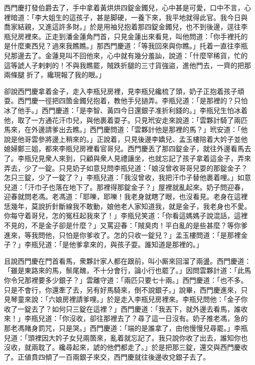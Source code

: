 西門慶打發伯爵去了，手中拿着黃烘烘四錠金鐲兒，心中甚是可愛，口中不言，心裡暗道：「李大姐生的這孩子，甚是脚硬，一養下來，我平地就得此官。我今日與喬家結親，又進這許多財。」於是用袖兒抱着那四錠金鐲兒，也不到後邊，逕往李瓶兒房裡來。正走到潘金蓮角門首，只見金蓮出來看見，叫他問道：「你手裡托的是什麼東西兒？過來我瞧瞧。」那西門慶道：「等我回來與你瞧。」托着一直往李瓶兒那邊去了。{}金蓮見叫不回他來，心中就有幾分羞訕，說道：「什麼罕稀貨，忙的這等諕人子剌剌的！不與我瞧罷，賊跌折腿的三寸貨強盜，進他門去，一齊的把那兩條腿𢱉折了，纔現報了我的眼。」

卻說西門慶拿着金子，走入李瓶兒房裡，見李瓶兒纔梳了頭，奶子正抱着孩子頑耍。西門慶一徑把四箇金鐲兒抱着，教他手兒撾弄。李瓶兒道：「是那裡的？只怕冰了他手。」西門慶道：「是李智、黃四今日還銀子准折利錢的。」李瓶兒生怕冰着他，取了一方通花汗巾兒，與他裹着耍子。只見玳安走來說道：「雲夥計騎了兩匹馬來，在外邊請爹出去瞧。」西門慶問道：「雲夥計他是那裡的馬？」玳安道：「他說是他哥雲參將邊上稍來的。」正說着，只見後邊李嬌兒、孟玉樓陪着大妗子並他媳婦鄭三姐，都來李瓶兒房裡看官哥兒。西門慶丟了那四錠金子，就往外邊看馬去了。李瓶兒見衆人來到，只顧與衆人見禮讓坐，也就忘記了孩子拿着這金子，弄來弄去，少了一錠。只見奶子如意兒問李瓶兒道：「娘沒曾收哥哥兒耍的那錠金子？怎只三錠，少了一錠了？」李瓶兒道：「我沒曾收，我把汗巾子替他裹着哩。」如意兒道：「汗巾子也落在地下了。那裡得那錠金子？」屋裡就亂起來。奶子問迎春，迎春就問老馮。老馮道：「耶嚛，耶嚛！我老身就瞎了眼，也沒看見。老身在這裡恁幾年，莫說折針斷線我不敢動，娘他老人家知道我，就是金子，我老身也不愛。你每守着哥兒，怎的冤枉起我來了！」李瓶兒笑道：「你看這媽媽子說混話，這裡不見的，不是金子卻是什麼？」又罵迎春：「賊臭肉！平白亂的是些甚麼？等你爹進來，等我問他，只怕是你爹收了。怎的只收一錠兒？」孟玉樓問道：「是那裡金子？」李瓶兒道：「是他爹拿來的，與孩子耍。誰知道是那裡的。」

且說西門慶在門首看馬，衆夥計家人都在跟前，叫小厮來回溜了兩盪。西門慶道：「雖是東路來的馬，鬃尾醜，不十分會行，論小行也罷了。」因問雲夥計道：「此馬你令兄那裡要多少銀子？」雲離守道：「兩匹只要七十兩。」西門慶道：「也不多。只是不會行，你還牽了去，另有好馬騎來，倒不說銀子。」說畢，西門慶進來，只見琴童來說：「六娘房裡請爹哩。」於是走入李瓶兒房裡來。李瓶兒問他：「金子你收了一錠去了？如何只三錠在這裡？」西門慶道：「我丟下，就外邊去看馬，誰收來！」李瓶兒道：「你沒收，卻往那裡去了？尋了這一日沒有。奶子推老馮，急的那老馮賭身罰咒，只是哭。」西門慶道：「端的是誰拿了，由他慢慢兒尋罷。」李瓶兒道：「頭裡因大妗子女兒兩箇來，亂着就忘記了。我只說你收了出去，誰知你也沒收，就兩耽了。纔尋起來，諕的他們都走了。」於是把那三錠，還交與西門慶收了。正値賁四傾了一百兩銀子來交，西門慶就往後邊收兌銀子去了。

